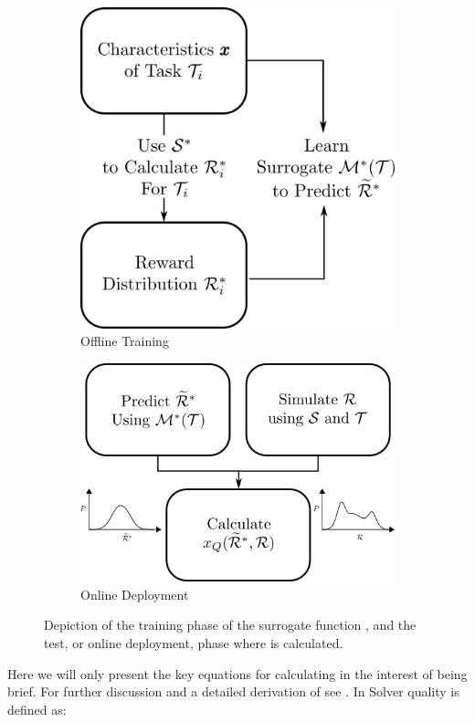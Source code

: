 \begin{figure}[tbp]
    \centering
    \begin{subfigure}[c]{0.50\linewidth}
        \centering
        \includegraphics[width=0.75\linewidth]{Figures/SQ_train.png}
        \vfill
        \caption{Offline Training}
        \label{fig:sq_train}
    \end{subfigure}%
    \hfill
    \begin{subfigure}[c]{0.50\linewidth}
        \centering
        \includegraphics[width=0.75\linewidth]{Figures/SQ_test.png}
        \caption{Online Deployment}
        \label{fig:sq_test}
    \end{subfigure} 
    \caption{Depiction of the training phase of the surrogate function \surrogate, and the test, or online deployment, phase where \xQ{} is calculated.}
    \label{fig:sq_test_train}
\end{figure}

Here we will only present the key equations for calculating \xQ{} in the interest of being brief. For further discussion and a detailed derivation of \xQ{} see \cite{Israelsen2018-qz}. In \cite{Israelsen2018-qz} Solver quality is defined as:

